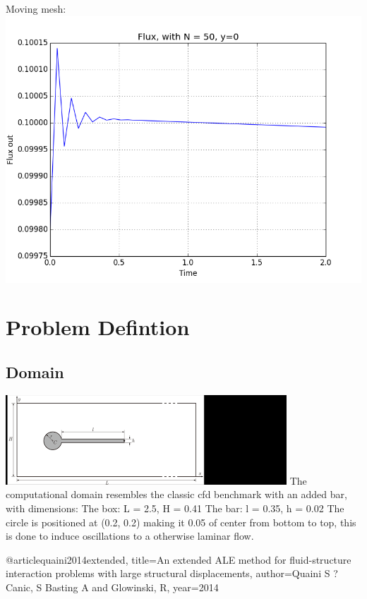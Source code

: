 Moving mesh:\\
\includegraphics[scale=0.4]{FluxPlot_E_N_50_dt_005.png}









\newpage

\section*{Problem Defintion}
\subsection*{Domain}
\includegraphics[scale=0.9]{geometry.png}
The computational domain resembles the classic cfd benchmark with an added bar, with dimensions:
The box: L = 2.5, H = 0.41
The bar: l = 0.35, h = 0.02
The circle is positioned at (0.2, 0.2) making it 0.05 of center from bottom to top, this is done to induce oscillations to a otherwise laminar flow.





@article{quaini2014extended,
  title={An extended ALE method for fluid-structure interaction problems with large structural displacements},
  author={Quaini S ?Canic, S Basting A and Glowinski, R},
  year={2014}
}



